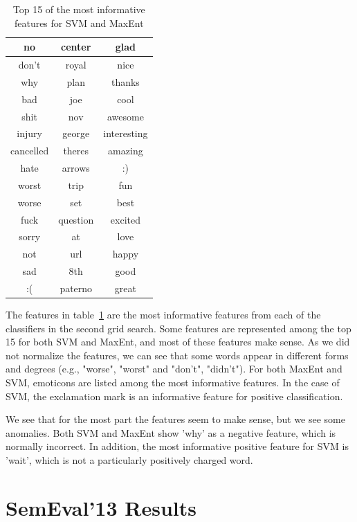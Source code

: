 \begin{table}[t!]
\begin{minipage}{.45\linewidth}
\begin{tabular}{|c|c|c|}
		no 	& center & glad \\ \hline
		don't 	& royal & nice \\ \hline
		why 	& plan & thanks \\ \hline
		bad 	& joe & cool \\ \hline
		shit 	& nov & awesome \\ \hline
		injury 	& george & interesting \\ \hline
		cancelled 	& theres & amazing \\ \hline
		hate 	& arrows & :) \\ \hline
		worst 	& trip & fun \\ \hline
		worse 	& set & best \\ \hline
		fuck 	& question & excited \\ \hline
		sorry 	& at & love \\ \hline
		not 	& url & happy \\ \hline
		sad 	& 8th & good \\ \hline
		:( 	& paterno & great \\ \hline
		\end{tabular}
	\end{minipage}
	\caption[Most informative features]{Top 15 of the most informative features for SVM and MaxEnt}
	\label{tab:informative_features}
\end{table}

The features in table~\ref{tab:informative_features} are the most informative features from each of the classifiers in the second grid search. Some features are represented among the top 15 for both SVM and MaxEnt, and most of these features make sense. As we did not normalize the features, we can see that some words appear in different forms and degrees (e.g., "worse", "worst" and "don't", "didn't"). For both MaxEnt and SVM, emoticons are listed among the most informative features. In the case of SVM, the exclamation mark is an informative feature for positive classification.

We see that for the most part the features seem to make sense, but we see some anomalies. Both SVM and MaxEnt show 'why' as a negative feature, which is normally incorrect. In addition, the most informative positive feature for SVM is 'wait', which is not a particularly positively charged word.

\clearpage
\section{SemEval'13 Results}~\label{sec:semeval_result}

